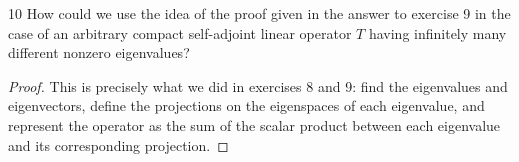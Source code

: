 \begin{exercise}{10}
How could we use the idea of the proof given in the answer to exercise 9 in the case of an arbitrary compact self-adjoint linear operator $T$ having infinitely many different nonzero eigenvalues?
\end{exercise}
\begin{proof}
This is precisely what we did in exercises 8 and 9:
find the eigenvalues and eigenvectors, define the projections on the eigenspaces of each eigenvalue, and represent the operator as the sum of the scalar product between each eigenvalue and its corresponding projection.
\end{proof} 
